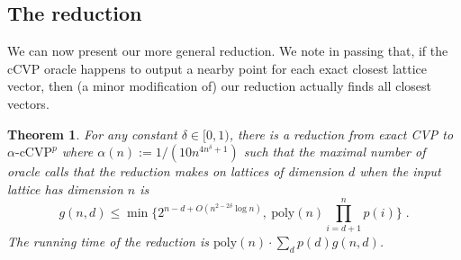 \documentclass[11pt]{article}
\newtheorem{theorem}{Theorem}[section]
\newcommand{\problem}[1]{\mbox{#1}\xspace}
\newcommand{\poly}{\mathrm{poly}}
\begin{document}
\subsection{The reduction}

We can now present our more general reduction. We note in passing that, if the cCVP oracle happens to output a nearby point for each exact closest lattice vector, then (a minor modification of) our reduction actually finds all closest vectors.

\begin{theorem}
\label{thm:CVPtonCVP}
For any constant $\delta \in [0,1)$, there is a reduction from exact CVP to $\alpha\text{-}\problem{cCVP}^p$ where $\alpha(n) :=  1/(10n^{4n^{\delta} +1})$ such that the maximal number of oracle calls that the reduction makes on lattices of dimension $d$ when the input lattice has dimension $n$ is 
\[
g(n,d) \leq \min\Big\{ 2^{n-d+O(n^{2-2\delta} \log n)},\ \poly(n) \prod_{i=d+1}^n p(i) \Big\} 
\; .
\] The running time of the reduction is $\poly(n) \cdot \sum_d p(d) g(n,d)$.
\end{theorem}
\end{document}
